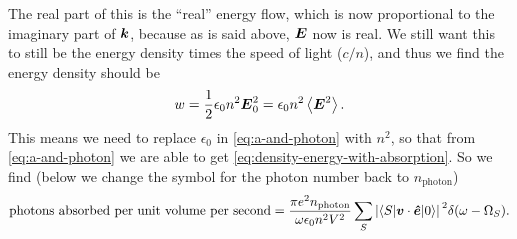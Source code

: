 \documentclass[hyperref, a4paper, 12pt]{report}
\begin{document}
The real part of this is the ``real'' energy flow,
which is now proportional to the imaginary part of $\vb*{k}$, 
because as is said above, $\vb*{E}$ now is real.
We still want this to still be 
the energy density times the speed of light ($c / n$),
and thus we find the energy density should be 
\begin{equation}
    w = \frac{1}{2} \epsilon_0 n^2 \vb*{E}_0^2 = \epsilon_0 n^2 \expval{\vb*{E}^2}.
    \label{eq:density-energy-with-absorption}
\end{equation}
This means we need to replace $\epsilon_0$ in \eqref{eq:a-and-photon}
with $n^2$,
so that from \eqref{eq:a-and-photon} we are able to get \eqref{eq:density-energy-with-absorption}.
So we find (below we change the symbol for the photon number 
back to $n_{\text{photon}}$)
\begin{equation}
    \text{photons absorbed per unit volume per second} 
    = \frac{\pi e^2 n_{\text{photon}}}{\omega \epsilon_0 n^2 V^2} 
    \sum_S \abs*{\mel**{S}{\vb*{v} \cdot \vu*{e}}{0}}^2 \delta(\omega - \Omega_S).
\end{equation}
\end{document}
